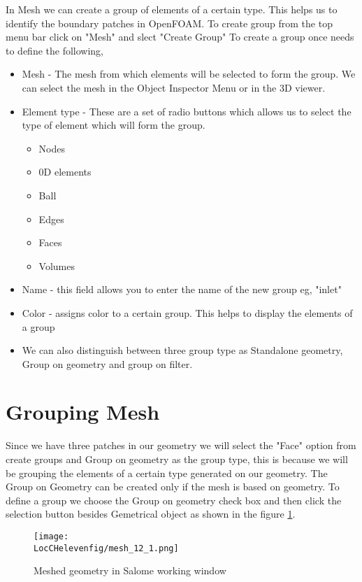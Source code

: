 In Mesh we can create a group of elements of a certain type. This helps us to identify the boundary patches in OpenFOAM. To create group from the top menu bar click on "Mesh" and slect "Create Group" To create a group once needs to define the following, \newline
\begin{itemize}
\item Mesh - The mesh from which elements will be selected to form the group. We can select the mesh in the Object Inspector Menu or in the 3D viewer.
\item Element type - These are a set of radio buttons which allows us to select the type of element which will form the group.
\begin{itemize}
\item Nodes
\item 0D elements
\item Ball
\item Edges
\item Faces
\item Volumes
\end{itemize}
\item Name - this field allows you to enter the name of the new group eg, "inlet"
\item Color - assigns color to a certain group. This helps to display the elements of a group
\item We can also distinguish between three group type as Standalone geometry, Group on geometry and group on filter.
\end{itemize}

\section{Grouping Mesh}
Since we have three patches in our geometry we will select the "Face" option from create groups and Group on geometry as the group type, this is because we will be grouping the elements of a certain type generated on our geometry. The Group on Geometry can be created only if the mesh is based on geometry. To define a group we choose the Group on geometry check box and then click the selection button besides Gemetrical object as shown in the figure \ref{mesh_1}. 

\begin{figure}[h]  
\centering
\texttt{[image: \\LocCHelevenfig/mesh\_12\_1.png]}
\caption{Meshed geometry in Salome working window}
\label{mesh_1}
\end{figure} 

